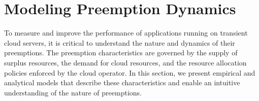 \section{Modeling Preemption Dynamics}
\label{sec:preemption-dynamics}



To measure and improve the performance of applications running on transient cloud servers, it is critical to understand the nature and dynamics of their preemptions.
The preemption characteristics are governed by the supply of surplus resources, the demand for cloud resources, and the resource allocation policies enforced by the cloud operator.
In this section, we present empirical and analytical models that describe these characteristics and enable an intuitive understanding of the nature of preemptions. 







